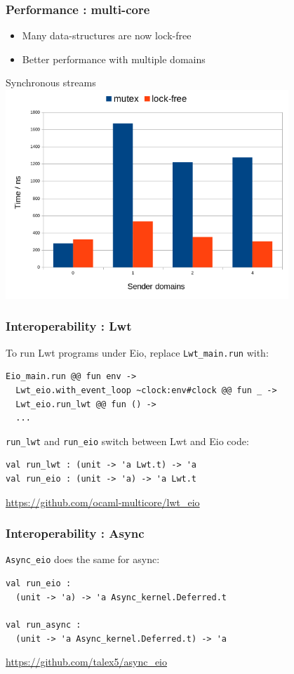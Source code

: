 \documentclass{beamer}
\begin{document}
\begin{frame}
	\frametitle{Performance : multi-core}
	\bigskip
	\begin{itemize}
		\item Many data-structures are now lock-free
		\item Better performance with multiple domains
	\end{itemize}
	\bigskip
	\centering
	Synchronous streams\\
	\includegraphics[width=0.8\textwidth]{lock-free.png}
\end{frame}

\begin{frame}[fragile]
	\frametitle{Interoperability : Lwt}
	To run Lwt programs under Eio, replace \verb|Lwt_main.run| with:
\begin{lstlisting}[style=ocaml]
  Eio_main.run @@ fun env ->
  Lwt_eio.with_event_loop ~clock:env#clock @@ fun _ ->
  Lwt_eio.run_lwt @@ fun () ->
  ...
\end{lstlisting}
\verb|run_lwt| and \verb|run_eio| switch between Lwt and Eio code:
\begin{lstlisting}[style=ocaml]
val run_lwt : (unit -> 'a Lwt.t) -> 'a
val run_eio : (unit -> 'a) -> 'a Lwt.t
\end{lstlisting}
	\bigskip
	\url{https://github.com/ocaml-multicore/lwt_eio}
\end{frame}

\begin{frame}[fragile]
	\frametitle{Interoperability : Async}
	\verb|Async_eio| does the same for async:
	\bigskip
\begin{lstlisting}[style=ocaml]
val run_eio :
  (unit -> 'a) -> 'a Async_kernel.Deferred.t

val run_async :
  (unit -> 'a Async_kernel.Deferred.t) -> 'a
\end{lstlisting}
	\bigskip
	\url{https://github.com/talex5/async_eio}
\end{frame}
\end{document}
